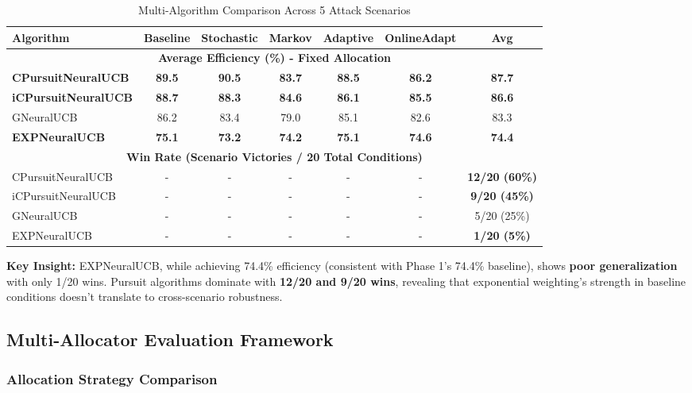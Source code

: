 \documentclass[11pt,a4paper]{article}
\newcommand{\performance}[1]{\textcolor{performancecolor}{\textbf{#1}}}
\newcommand{\stochastic}[1]{\textcolor{stochasticcolor}{\textbf{#1}}}
\newcommand{\critical}[1]{\textcolor{criticalcolor}{\textbf{#1}}}
\newcommand{\success}[1]{\textcolor{successcolor}{\textbf{#1}}}
\begin{document}
\begin{table}[H]
\centering
\small
\caption{Multi-Algorithm Comparison Across 5 Attack Scenarios}
\begin{tabular}{|l|c|c|c|c|c|c|}
\hline
\textbf{Algorithm} & \textbf{Baseline} & \textbf{Stochastic} & \textbf{Markov} & \textbf{Adaptive} & \textbf{OnlineAdapt} & \textbf{Avg} \\
\hline
\hline
\multicolumn{7}{|c|}{\textbf{Average Efficiency (\%) - Fixed Allocation}} \\
\hline
\success{CPursuitNeuralUCB} & \success{89.5} & \success{90.5} & \success{83.7} & \success{88.5} & \success{86.2} & \success{87.7} \\
\success{iCPursuitNeuralUCB} & \success{88.7} & \success{88.3} & \success{84.6} & \success{86.1} & \success{85.5} & \success{86.6} \\
GNeuralUCB & 86.2 & 83.4 & 79.0 & 85.1 & 82.6 & 83.3 \\
\performance{EXPNeuralUCB} & \performance{75.1} & \stochastic{73.2} & \performance{74.2} & \performance{75.1} & \performance{74.6} & \performance{74.4} \\
\hline
\multicolumn{7}{|c|}{\textbf{Win Rate (Scenario Victories / 20 Total Conditions)}} \\
\hline
CPursuitNeuralUCB & - & - & - & - & - & \success{12/20 (60\%)} \\
iCPursuitNeuralUCB & - & - & - & - & - & \success{9/20 (45\%)} \\
GNeuralUCB & - & - & - & - & - & 5/20 (25\%) \\
EXPNeuralUCB & - & - & - & - & - & \critical{1/20 (5\%)} \\
\hline
\end{tabular}
\end{table}

\textbf{Key Insight:} EXPNeuralUCB, while achieving 74.4\% efficiency (consistent with Phase 1's 74.4\% baseline), shows \critical{poor generalization} with only 1/20 wins. Pursuit algorithms dominate with \success{12/20 and 9/20 wins}, revealing that exponential weighting's strength in baseline conditions doesn't translate to cross-scenario robustness.

\subsection{Multi-Allocator Evaluation Framework}

\subsubsection{Allocation Strategy Comparison}
\end{document}
